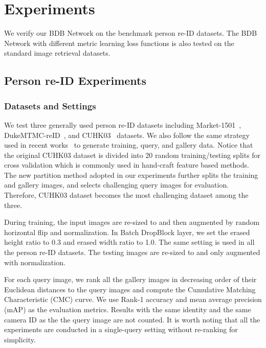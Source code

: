 \section{Experiments}
We verify our BDB Network on the benchmark person re-ID datasets.
The BDB Network with different metric learning loss functions is also tested on the standard image retrieval datasets. 

\subsection{Person re-ID Experiments}
\subsubsection{Datasets and Settings}
We test three generally used person re-ID datasets including Market-1501~\cite{zheng2015scalable}, DukeMTMC-reID~\cite{Ristani2016Performance,zheng2017unlabeled}, and CUHK03~\cite{Li2014DeepReID} datasets. 
We also follow the same strategy used in recent works~\cite{hermans2017defense, sun2017beyond, wang2018mgn} to generate training, query, and gallery data.
Notice that the original CUHK03 dataset is divided into 20 random training/testing splits for cross validation which is commonly used in hand-craft feature based methods. 
The new partition method adopted in our experiments further splits the training and gallery images, and selects challenging query images for evaluation. 
Therefore, CUHK03 dataset becomes the most challenging dataset among the three.

During training, the input images are re-sized to  and then augmented by random horizontal flip and normalization.
In Batch DropBlock layer, we set the erased height ratio  to 0.3 and erased width ratio  to 1.0. The same setting is used in all the person re-ID datasets. The testing images are re-sized to  and only augmented with normalization.

For each query image, we rank all the gallery images in decreasing order of their Euclidean distances to the query images and compute the Cumulative Matching Characteristic (CMC) curve. 
We use Rank-1 accuracy and mean average precision (mAP) as the evaluation metrics. 
Results with the same identity and the same camera ID as the the query image are not counted. 
It is worth noting that all the experiments are conducted in a single-query setting without re-ranking\cite{bai2017reid,zhong2017re} for simplicity.
\vspace{-3mm}
